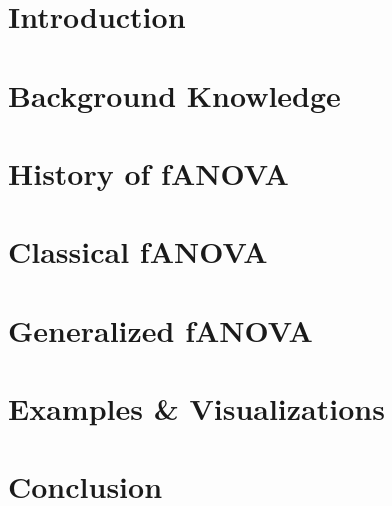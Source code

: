 \documentclass[12pt]{article}
\begin{document}
\newpage
\tableofcontents

\newpage


    
\section{Introduction}
\label{intro}

\newpage

\section{Background Knowledge}
\label{background}

\newpage
\section{History of fANOVA}

\label{history_fANOVA}
\newpage
\section{Classical fANOVA}

\label{classical_fANOVA}
\newpage
\section{Generalized fANOVA}
\label{generalization}

\newpage

\newpage
\section{Examples \& Visualizations}
\label{example}
\newpage

\section{Conclusion}
\label{conclusion}




\newpage

    
\end{document}
